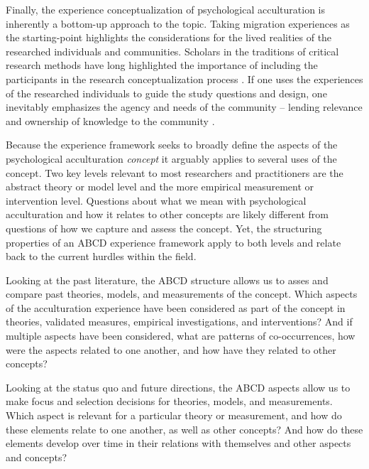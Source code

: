 \documentclass[nobib]{tufte-handout}
\begin{document}
Finally, the experience conceptualization of psychological acculturation is inherently a bottom-up approach to the topic. Taking migration experiences as the starting-point highlights the considerations for the lived realities of the researched individuals and communities. Scholars in the traditions of critical research methods have long highlighted the importance of including the participants in the research conceptualization process \citep[e.g.,][]{Kovach2009}. If one uses the experiences of the researched individuals to guide the study questions and design, one inevitably emphasizes the agency and needs of the community -- lending relevance and ownership of knowledge to the community \citep[e.g., ][]{Schmidt2021}.

Because the experience framework seeks to broadly define the aspects of the psychological acculturation \textit{concept} it arguably applies to several uses of the concept. Two key levels relevant to most researchers and practitioners are the abstract theory or model level and the more empirical measurement or intervention level. Questions about what we mean with psychological acculturation and how it relates to other concepts are likely different from questions of how we capture and assess the concept. Yet, the structuring properties of an ABCD experience framework apply to both levels and relate back to the current hurdles within the field.

Looking at the past literature, the ABCD structure allows us to asses and compare past theories, models, and measurements of the concept. Which aspects of the acculturation experience have been considered as part of the concept in theories, validated measures, empirical investigations, and interventions? And if multiple aspects have been considered, what are patterns of co-occurrences, how were the aspects related to one another, and how have they related to other concepts?

Looking at the status quo and future directions, the ABCD aspects allow us to make focus and selection decisions for theories, models, and measurements. Which aspect is relevant for a particular theory or measurement, and how do these elements relate to one another, as well as other concepts? And how do these elements develop over time in their relations with themselves and other aspects and concepts?
\end{document}
